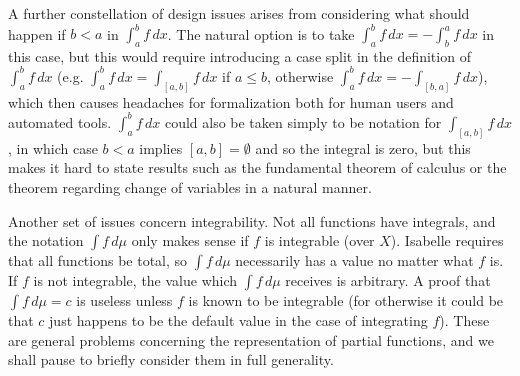 \documentclass{article}
\theoremstyle{definition}
\begin{document}
A further constellation of design issues arises from considering what should happen if $b < a$ in $\int_a^b f \, dx$. The natural option is to take $\int_a^b f \, dx = -\int_b^a f \, dx$ in this case, but this would require introducing a case split in the definition of $\int_a^b f \, dx$ (e.g. $\int_a^b f \, dx = \int_{[a,b]} f \, dx$ if $a \le b$, otherwise $\int_a^b f \, dx = -\int_{[b,a]} f \, dx$), which then causes headaches for formalization both for human users and automated tools. $\int_a^b f \, dx$ could also be taken simply to be notation for $\int_{[a,b]} f \, dx$, in which case $b < a$ implies $[a,b] = \emptyset$ and so the integral is zero, but this makes it hard to state results such as the fundamental theorem of calculus or the theorem regarding change of variables in a natural manner.

Another set of issues concern integrability. Not all functions have integrals, and the notation $\int f \, d\mu$ only makes sense if $f$ is integrable (over $X$). Isabelle requires that all functions be total, so $\int f \, d\mu$ necessarily has a value no matter what $f$ is. If $f$ is not integrable, the value which $\int f \, d\mu$ receives is arbitrary. A proof that $\int f \, d\mu = c$ is useless unless $f$ is known to be integrable (for otherwise it could be that $c$ just happens to be the default value in the case of integrating $f$). These are general problems concerning the representation of partial functions, and we shall pause to briefly consider them in full generality.
\end{document}
